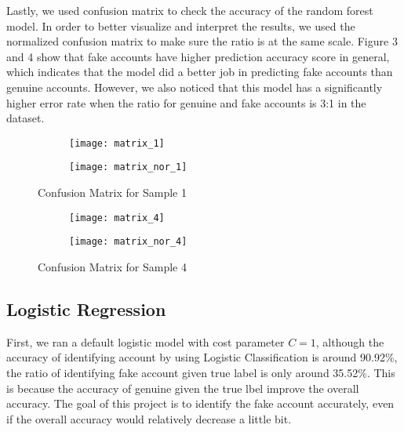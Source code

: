 \documentclass[a4paper, 12pt]{report}
\begin{document}
\noindent Lastly, we used confusion matrix to check the accuracy of the random forest model. In order to better visualize and interpret the results, we used the normalized confusion matrix to make sure the ratio is at the same scale. Figure 3 and 4 show that fake accounts have higher prediction accuracy score in general, which indicates that the model did a better job in predicting fake accounts than genuine accounts. However, we also noticed that this model has a significantly higher error rate when the ratio for genuine and fake accounts is 3:1 in the dataset. 

\begin{figure}[h!]
	\centering
	\begin{subfigure}{0.45\linewidth}
		\centering
		\texttt{[image: matrix\_1]}
	\end{subfigure}%
	\begin{subfigure}{0.45\linewidth}
		\centering
		\texttt{[image: matrix\_nor\_1]}
	\end{subfigure}
	\caption{Confusion Matrix for Sample 1}
\end{figure}

\begin{figure}[h!]
	\centering
	\begin{subfigure}{0.45\linewidth}
		\centering
		\texttt{[image: matrix\_4]}
	\end{subfigure}%
	\begin{subfigure}{0.45\linewidth}
		\centering
		\texttt{[image: matrix\_nor\_4]}
	\end{subfigure}
	\caption{Confusion Matrix for Sample 4}
\end{figure}

\subsection*{Logistic Regression}
First, we ran a default logistic model with cost parameter $C=1$, although the accuracy of identifying account by using Logistic Classification is around 90.92\%, the ratio of identifying fake account given true label is only around 35.52\%. This is because the accuracy of genuine given the true lbel improve the overall accuracy. The goal of this project is to identify the fake account accurately, even if the overall accuracy would relatively decrease a little bit.
\end{document}
